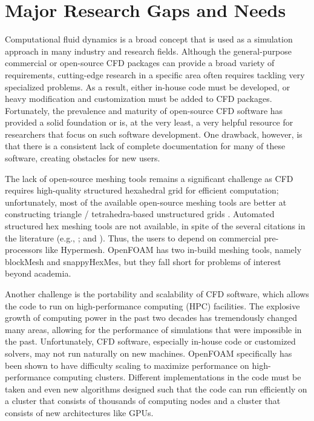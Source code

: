\section{Major Research Gaps and Needs}
\label{sec:resp_cfd_water_gaps}

Computational fluid dynamics is a broad concept that is used as a simulation approach in many industry and research fields. Although the general-purpose commercial or open-source CFD packages can provide a broad variety of requirements, cutting-edge research in a specific area often requires tackling very specialized problems. As a result, either in-house code must be developed, or heavy modification and customization must be added to CFD packages. Fortunately, the prevalence and maturity of open-source CFD software has provided a solid foundation or is, at the very least, a very helpful resource for researchers that focus on such software development.  One drawback, however, is that there is a consistent lack of complete documentation for many of these software, creating obstacles for new users.

The lack of open-source meshing tools remains a significant challenge as CFD requires high-quality structured hexahedral grid for efficient computation;  unfortunately, most of the available open-source meshing tools are better at constructing triangle / tetrahedra-based unstructured grids \citep{geuzaine2009gmsh}. Automated structured hex meshing tools are not available, in spite of the several citations in the literature (e.g., \cite{yamakawa2003fully, verhetsel2019finding}; and \cite{gao2017robust}). Thus, the users to depend on commercial pre-processors like Hypermesh. OpenFOAM has two in-build meshing tools, namely blockMesh and snappyHexMes, but they fall short for problems of interest beyond academia. 

Another challenge is the portability and scalability of CFD software, which allows the code to run on high-performance computing (HPC) facilities. The explosive growth of computing power in the past two decades has tremendously changed many areas, allowing for the performance of simulations that were impossible in the past. Unfortunately, CFD software, especially in-house code or customized solvers, may not run naturally on new machines.  OpenFOAM specifically has been shown to have difficulty scaling to maximize performance on high-performance computing clusters. Different implementations in the code must be taken and even new algorithms designed such that the code can run efficiently on a cluster that consists of thousands of computing nodes and a cluster that consists of new architectures like GPUs.

